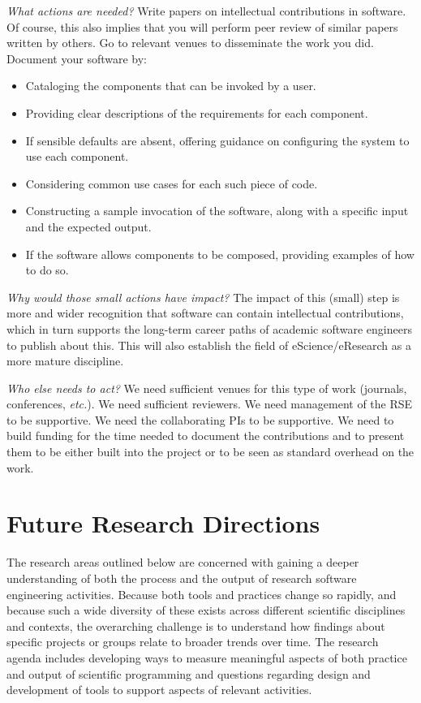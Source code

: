 \documentclass[a4paper,UKenglish]{dagman}
\newcommand{\etc}{\emph{etc.}\xspace}
\begin{document}
\emph{What actions are needed?}
Write papers on intellectual contributions in software. Of course, this also implies that you will perform peer review of similar papers written by others. Go to relevant venues to disseminate the work you did.
Document your software by:
\begin{itemize}
\item Cataloging the components that can be invoked by a user.
\item Providing clear descriptions of the requirements for each component.
\item If sensible defaults are absent, offering guidance on configuring the system to use each component.
\item Considering common use cases for each such piece of code.
\item Constructing a sample invocation of the software, along with a specific input and the expected output.
\item If the software allows components to be composed, providing examples of how to do so.
\end{itemize}


\emph{Why would those small actions have impact?}
The impact of this (small) step is more and wider recognition that software can contain intellectual contributions, which in turn supports the long-term career paths of academic software engineers to publish about this. This will also establish the field of eScience/eResearch as a more mature discipline.

\emph{Who else needs to act?}
We need sufficient venues for this type of work (journals, conferences, \etc).  We need sufficient reviewers.  We need management of the RSE to be supportive.  We need the collaborating PIs to be supportive.  We need to build funding for the time needed to document the contributions and to present them to be either built into the project or to be seen as standard overhead on the work.

\newpage
\section{Future Research Directions}

The research areas outlined below are concerned with gaining a deeper understanding of both the process and the output of research software engineering activities. Because both tools and practices change so rapidly, and because such a wide diversity of these exists across different scientific disciplines and contexts, the overarching challenge is to understand how findings about specific projects or groups relate to broader trends over time. The research agenda includes developing ways to measure meaningful aspects of both practice and output of scientific programming and questions regarding design and development of tools to support aspects of relevant activities.
\end{document}
